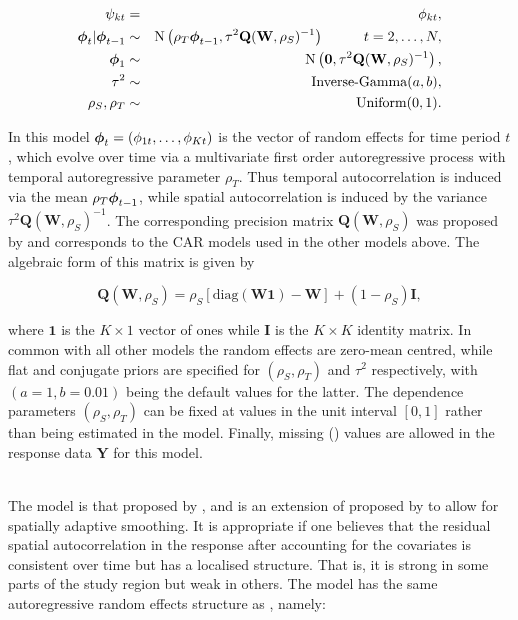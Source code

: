 \documentclass[article, nojss]{jss}
\newcommand{\bd}[1]{\ensuremath{\mbox{\boldmath $#1$}}}
\begin{document}
\begin{eqnarray}
\psi_{kt}&=&\phi_{kt},\label{carar}\\
\bd{\phi}_t|\bd{\phi}_{t-1} & \sim & \mbox{N}\left(\rho_T\bd{\phi}_{t-1}, \tau^{2} \mathbf{Q}(\mathbf{W},\rho_S)^{-1}\right)\hspace{1cm} t=2,\ldots,N,\nonumber\\
\bd{\phi}_1 & \sim & \mbox{N}\left(\mathbf{0}, \tau^{2} \mathbf{Q}(\mathbf{W},\rho_S)^{-1}\right),\nonumber\\
\tau^2&\sim&\mbox{Inverse-Gamma}(a,b),\nonumber\\
\rho_S,\rho_T&\sim&\mbox{Uniform}(0,1).\nonumber
\end{eqnarray}

In this model $\bd{\phi}_{t}=(\phi_{1t},\ldots,\phi_{Kt})$ is the vector of random effects for time period $t$, which  evolve over time via a multivariate first order autoregressive process with temporal autoregressive parameter $\rho_T$. Thus temporal autocorrelation is induced via the mean $\rho_T\bd{\phi}_{t-1}$, while spatial autocorrelation is induced by the variance $\tau^{2} \mathbf{Q}(\mathbf{W},\rho_S)^{-1}$. The corresponding precision matrix $\mathbf{Q}(\mathbf{W},\rho_S)$ was proposed by \cite{leroux2000} and corresponds to the CAR models used in the other models above. The algebraic form of this matrix is given by

\begin{equation}
\mathbf{Q}(\mathbf{W},\rho_S)=\rho_S[\mbox{diag}(\mathbf{W}\mathbf{1}) - \mathbf{W}] + (1-\rho_S)\mathbf{I},\label{Lerouxjoint}
\end{equation}

where $\mathbf{1}$ is the $K\times 1$ vector of ones while $\mathbf{I}$ is the $K\times K$ identity matrix. In common with all other models the random effects are zero-mean centred, while flat and conjugate priors are specified for $(\rho_S, \rho_T)$ and $\tau^2$ respectively, with $(a=1, b=0.01)$ being the default values for the latter. The  dependence parameters $(\rho_{S}, \rho_{T})$ can be fixed at values in the unit interval $[0,1]$ rather than being estimated in the model. Finally, missing () values are allowed in the response data $\mathbf{Y}$ for this model.\vspace{1cm}


\\
The model is that proposed by \cite{rushworth2016}, and is an extension of  proposed by \cite{rushworth2014} to allow for spatially adaptive smoothing. It is appropriate if one believes that the residual spatial autocorrelation in the response after accounting for the covariates is consistent over time but has a localised structure. That is, it is strong in some parts of the study region but weak in others. The model has the same autoregressive random effects structure as  , namely:
\end{document}
